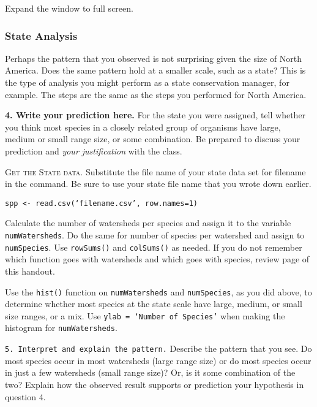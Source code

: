 \documentclass[11pt]{article}
\begin{document}
Expand the window to full screen. 

\subsubsection*{State Analysis}

Perhaps the pattern that you observed is not surprising given the size
of North America. Does the same pattern hold at a smaller scale, such as a state?
This is the type of analysis you might perform as a state conservation
manager, for example. The steps are the same as the steps you
performed for North America.

\textbf{4. Write your prediction here.} For the state you were assigned, 
tell whether you think most species in a closely related
group of organisms have large, medium or small range size, or some
combination. Be prepared to discuss your prediction and \emph{your
justification} with the class.

\vspace{7\baselineskip}

\textsc{Get the State data.} Substitute the file name of your state data set for filename in
the command. Be sure to use your state file name that you wrote down
earlier.


\texttt{spp \textless{}-
read.csv(‘filename.csv’, row.names=1)}

Calculate the number of watersheds per species and assign it to the
variable \texttt{numWatersheds}. Do the same for number of species per
watershed and assign to \texttt{numSpecies}. Use \texttt{rowSums()} and
\texttt{colSums()} as needed. If you do not remember which function goes
with watersheds and which goes with species, review page \pageref{tab:colrowsums} of this handout.

Use the \texttt{hist()} function on \texttt{numWatersheds} and \texttt{numSpecies}, as you did above,
to determine whether most species at the state scale have large, medium, or
small size ranges, or a mix.  Use \texttt{ylab = ‘Number of Species’} when making the histogram
for \texttt{numWatersheds}. 

\texttt{5. Interpret and explain the pattern.} Describe the pattern that you see. Do most
species occur in most watersheds (large range size) or do most species
occur in just a few watersheds (small range size)? Or, is it some
combination of the two? Explain how the observed result supports or
prediction your hypothesis in question 4.
\end{document}
